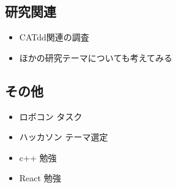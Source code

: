 \documentclass[uplatex, onecolumn, 10pt]{jsarticle}
\begin{document}
\subsection*{研究関連}
\begin{itemize}
	\item CATdd関連の調査
    \item ほかの研究テーマについても考えてみる
\end{itemize}

\subsection*{その他}
\begin{itemize}
    \item ロボコン タスク
    \item ハッカソン テーマ選定
    \item c++ 勉強
    \item React 勉強
\end{itemize}
\end{document}
